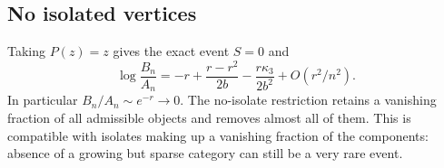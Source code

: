 \subsection{No isolated vertices}
Taking $P(z)=z$ gives the exact event $S=0$ and
\begin{equation}\label{sfh:eq:BA}
 \log\frac{B_n}{A_n}
 =-r+\frac{r-r^2}{2b}-\frac{r\kappa_3}{2b^2}+O(r^2/n^2).
\end{equation}
In particular $B_n/A_n\sim e^{-r}\to0$. The no-isolate restriction retains a vanishing fraction of all admissible objects and removes almost all of them. This is compatible with isolates making up a vanishing fraction of the components: absence of a growing but sparse category can still be a very rare event.
